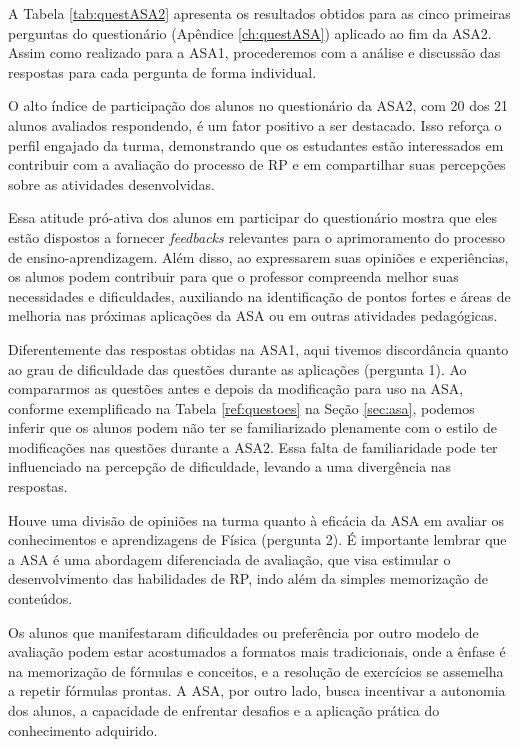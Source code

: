 A Tabela \ref{tab:questASA2} apresenta os resultados obtidos para as cinco primeiras perguntas do questionário (Apêndice \ref{ch:questASA}) aplicado ao fim da ASA2. Assim como realizado para a ASA1, procederemos com a análise e discussão das respostas para cada pergunta de forma individual.

O alto índice de participação dos alunos no questionário da ASA2, com 20 dos 21 alunos avaliados respondendo, é um fator positivo a ser destacado. Isso reforça o perfil engajado da turma, demonstrando que os estudantes estão interessados em contribuir com a avaliação do processo de RP e em compartilhar suas percepções sobre as atividades desenvolvidas.

Essa atitude pró-ativa dos alunos em participar do questionário mostra que eles estão dispostos a fornecer \textit{feedbacks} relevantes para o aprimoramento do processo de ensino-aprendizagem. Além disso, ao expressarem suas opiniões e experiências, os alunos podem contribuir para que o professor compreenda melhor suas necessidades e dificuldades, auxiliando na identificação de pontos fortes e áreas de melhoria nas próximas aplicações da ASA ou em outras atividades pedagógicas.

Diferentemente das respostas obtidas na ASA1, aqui tivemos discordância quanto ao grau de dificuldade das questões durante as aplicações (pergunta 1). Ao compararmos as questões antes e depois da modificação para uso na ASA, conforme exemplificado na Tabela \ref{ref:questoes} na Seção \ref{sec:asa}, podemos inferir que os alunos podem não ter se familiarizado plenamente com o estilo de modificações nas questões durante a ASA2. Essa falta de familiaridade pode ter influenciado na percepção de dificuldade, levando a uma divergência nas respostas.

Houve uma divisão de opiniões na turma quanto à eficácia da ASA em avaliar os conhecimentos e aprendizagens de Física (pergunta 2). É importante lembrar que a ASA é uma abordagem diferenciada de avaliação, que visa estimular o desenvolvimento das habilidades de RP, indo além da simples memorização de conteúdos.

Os alunos que manifestaram dificuldades ou preferência por outro modelo de avaliação podem estar acostumados a formatos mais tradicionais, onde a ênfase é na memorização de fórmulas e conceitos, e a resolução de exercícios se assemelha a repetir fórmulas prontas. A ASA, por outro lado, busca incentivar a autonomia dos alunos, a capacidade de enfrentar desafios e a aplicação prática do conhecimento adquirido.

